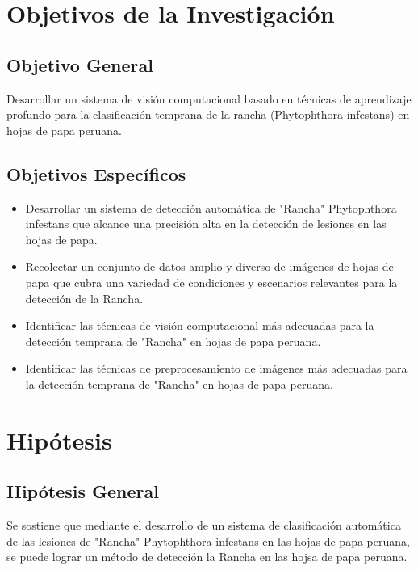 \section{Objetivos de la Investigación} 
\subsection{Objetivo General}
\newcommand{\ObjetivoGeneral}{
	Desarrollar un sistema de visión computacional basado en técnicas de aprendizaje profundo para la clasificación temprana de la rancha (Phytophthora infestans) en hojas de papa peruana.
}
\ObjetivoGeneral

\subsection{Objetivos Específicos}
\newcommand{\Objone}{
	Desarrollar un sistema de detección automática de "Rancha" Phytophthora infestans que alcance una precisión alta en la detección de lesiones en las hojas de papa.
}

\newcommand{\Objtwo}{
	Recolectar un conjunto de datos amplio y diverso de imágenes de hojas de papa que cubra una variedad de condiciones y escenarios relevantes para la detección de la Rancha.
}

\newcommand{\Objthree}{
Identificar las técnicas de visión computacional más adecuadas para la detección temprana de "Rancha" en hojas de papa peruana.
}

\newcommand{\Objfour}{
Identificar las técnicas de preprocesamiento de imágenes más adecuadas para la detección temprana de "Rancha" en hojas de papa peruana.
}


\begin{itemize}
	\item {\Objone}
	\item {\Objtwo}
	\item {\Objthree}
	\item {\Objfour}
\end{itemize}

\section{Hipótesis}

\subsection{Hipótesis General}
 \newcommand{\HipotesisGeneral}{
	Se sostiene que mediante el desarrollo de un sistema de clasificación automática de las lesiones de "Rancha" Phytophthora infestans en las hojas de papa peruana, se puede lograr un método de detección la Rancha en las hojsa de papa peruana.
	}
\HipotesisGeneral

